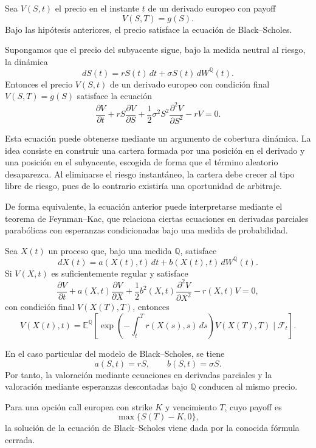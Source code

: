 Sea \(V(S,t)\) el precio en el instante \(t\) de un derivado europeo con payoff
\[
V(S,T)=g(S).
\]
Bajo las hipótesis anteriores, el precio satisface la ecuación de Black--Scholes.

\begin{theorem}
\label{th:ecuacion-black-scholes}
Supongamos que el precio del subyacente sigue, bajo la medida neutral al riesgo, la dinámica
\[
dS(t)=rS(t)\,dt+\sigma S(t)\,dW^{\mathbb{Q}}(t).
\]
Entonces el precio \(V(S,t)\) de un derivado europeo con condición final \(V(S,T)=g(S)\) satisface la ecuación
\[
\frac{\partial V}{\partial t}
+
rS\frac{\partial V}{\partial S}
+
\frac{1}{2}\sigma^2S^2
\frac{\partial^2 V}{\partial S^2}
-
rV
=0.
\]
\end{theorem}

Esta ecuación puede obtenerse mediante un argumento de cobertura dinámica. La idea consiste en construir una cartera formada por una posición en el derivado y una posición en el subyacente, escogida de forma que el término aleatorio desaparezca. Al eliminarse el riesgo instantáneo, la cartera debe crecer al tipo libre de riesgo, pues de lo contrario existiría una oportunidad de arbitraje.

De forma equivalente, la ecuación anterior puede interpretarse mediante el teorema de Feynman--Kac, que relaciona ciertas ecuaciones en derivadas parciales parabólicas con esperanzas condicionadas bajo una medida de probabilidad.

\begin{theorem}
\label{th:feynman-kac}
Sea \(X(t)\) un proceso que, bajo una medida \(\mathbb{Q}\), satisface
\[
dX(t)=a(X(t),t)\,dt+b(X(t),t)\,dW^{\mathbb{Q}}(t).
\]
Si \(V(X,t)\) es suficientemente regular y satisface
\[
\frac{\partial V}{\partial t}
+
a(X,t)\frac{\partial V}{\partial X}
+
\frac{1}{2}b^2(X,t)\frac{\partial^2 V}{\partial X^2}
-
r(X,t)V
=0,
\]
con condición final \(V(X(T),T)\), entonces
\[
V(X(t),t)
=
\mathbb{E}^{\mathbb{Q}}
\left[
\exp\left(-\int_t^T r(X(s),s)\,ds\right)
V(X(T),T)
\mid \mathcal{F}_t
\right].
\]
\end{theorem}

En el caso particular del modelo de Black--Scholes, se tiene
\[
a(S,t)=rS,
\qquad
b(S,t)=\sigma S.
\]
Por tanto, la valoración mediante ecuaciones en derivadas parciales y la valoración mediante esperanzas descontadas bajo \(\mathbb{Q}\) conducen al mismo precio.

Para una opción call europea con strike \(K\) y vencimiento \(T\), cuyo payoff es
\[
\max\{S(T)-K,0\},
\]
la solución de la ecuación de Black--Scholes viene dada por la conocida fórmula cerrada.

